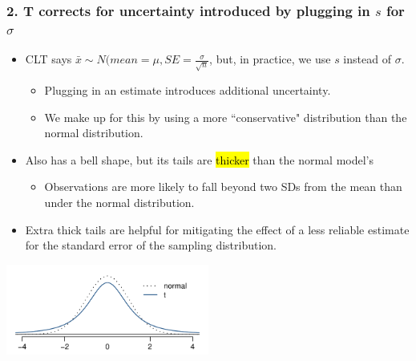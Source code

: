 \documentclass[11pt,containsverbatim,handout,xcolor=xelatex,dvipsnames,table]{beamer}
\begin{document}
\begin{frame}
\frametitle{2. T corrects for uncertainty introduced by plugging in $s$ for $\sigma$}

\begin{itemize}

\item CLT says $\bar{x} \sim N(mean = \mu, SE = \frac{\sigma}{\sqrt{n}}$, but, in practice, 
we use $s$ instead of $\sigma$.
\begin{itemize}
\item Plugging in an estimate introduces additional uncertainty.
\item We make up for this by using a more ``conservative" distribution than the normal distribution.
\end{itemize}

\pause

\item Also has a bell shape, but its tails are \hl{thicker} than the normal model's
\begin{itemize}
\item Observations are more likely to fall beyond two SDs from the mean than under the normal distribution.
\end{itemize}

\pause

\item Extra thick tails are helpful for mitigating the effect of a less reliable estimate for the standard 
error of the sampling distribution.

\end{itemize}

\begin{center}
\includegraphics[width=0.5\textwidth]{figures/tDistCompareToNormalDist/tDistCompareToNormalDist}
\end{center}

\end{frame}

\end{document}
